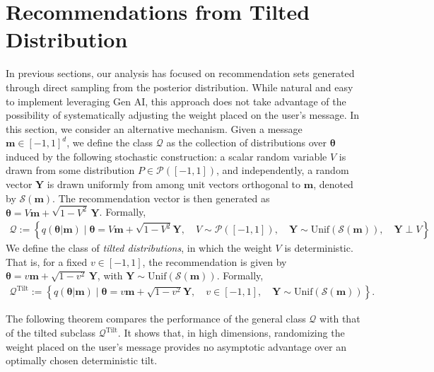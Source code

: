 \documentclass[12pt]{article}
\theoremstyle{definition}
\theoremstyle{remark}
\begin{document}
\section{Recommendations from Tilted Distribution}
\label{sec:tilted_dist}
In previous sections, our analysis has focused on recommendation sets generated through direct sampling from the posterior distribution. While natural and easy to implement leveraging Gen AI, this approach does not take advantage of the possibility of systematically adjusting the weight placed on the user’s message. In this section, we consider an alternative mechanism. Given a message $\mathbf{m} \in [-1,1]^d$, we define the class $\mathcal{Q}$ as the collection of distributions over $\boldsymbol{\theta}$ induced by the following stochastic construction: a scalar random variable $V$ is drawn from some distribution $P \in \mathcal{P}([-1,1])$, and independently, a random vector $\mathbf{Y}$ is drawn uniformly from among unit vectors orthogonal to $\mathbf{m}$, denoted by $\mathcal{S}(\mathbf{m})$. The recommendation vector is then generated as $\boldsymbol{\theta} = V \mathbf{m} + \sqrt{1 - V^2}\, \mathbf{Y}$. Formally,
\begin{align*}
\mathcal{Q} := \left\{ q(\boldsymbol{\theta}|\mathbf{m}) \mid \boldsymbol{\theta} = V\mathbf{m} + \sqrt{1-V^2} \mathbf{Y}, \quad V \sim \mathcal{P}([-1,1]), \quad \mathbf{Y} \sim \text{Unif}(\mathcal{S}(\mathbf{m})), \quad \mathbf{Y} \perp V \right\}
\end{align*}
We define the class of \textit{tilted distributions}, in which the weight $V$ is deterministic. That is, for a fixed $v \in [-1,1]$, the recommendation is given by $\boldsymbol{\theta} = v \mathbf{m} + \sqrt{1 - v^2}\, \mathbf{Y}$, with $\mathbf{Y} \sim \mathrm{Unif}(\mathcal{S}(\mathbf{m}))$. Formally,
\begin{align*}
    \mathcal{Q}^{\text{Tilt}} := \left\{ q(\boldsymbol{\theta}|\mathbf{m}) \mid \boldsymbol{\theta} = v\mathbf{m} + \sqrt{1-v^2} \mathbf{Y}, \quad v \in [-1, 1], \quad \mathbf{Y} \sim \text{Unif}(\mathcal{S}(\mathbf{m})) \right\}.
\end{align*}

The following theorem compares the performance of the general class $\mathcal{Q}$ with that of the tilted subclass $\mathcal{Q}^{\mathrm{Tilt}}$. It shows that, in high dimensions, randomizing the weight placed on the user’s message provides no asymptotic advantage over an optimally chosen deterministic tilt.
\end{document}
